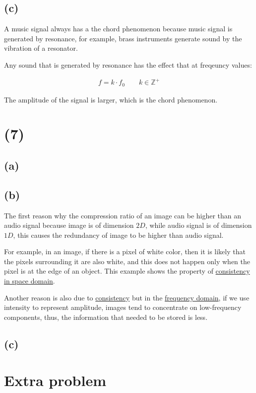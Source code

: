 \documentclass{article}
\begin{document}
\subsection*{(c)}

A music signal always has a the chord phenomenon because music signal is generated by resonance, 
for example, brass instruments generate sound by the vibration of a resonator.
\bigskip

Any sound that is generated by resonance has the effect that at freqeuncy values:

\begin{align*}
    f = k \cdot f_0 \qquad k \in \mathbb{Z}^+
\end{align*}

The amplitude of the signal is larger, which is the chord phenomenon.

\section*{(7)}

\subsection*{(a)}

\subsection*{(b)}

The first reason why the compression ratio of an image can be higher than an audio signal because image is of dimension $2D$,
while audio signal is of dimension $1D$, this causes the redundancy of image to be higher than audio signal.
\bigskip

For example, in an image, if there is a pixel of white color, then it is likely that the pixels surrounding it are also white,
and this does not happen only when the pixel is at the edge of an object. This example shows the property of \underline{consistency in space domain}.
\bigskip

Another reason is also due to \underline{consistency} but in the \underline{frequency domain}, 
if we use intensity to represent amplitude, images tend to concentrate on low-frequency components, 
thus, the information that needed to be stored is less.

\subsection*{(c)}



\section*{Extra problem}
\end{document}

